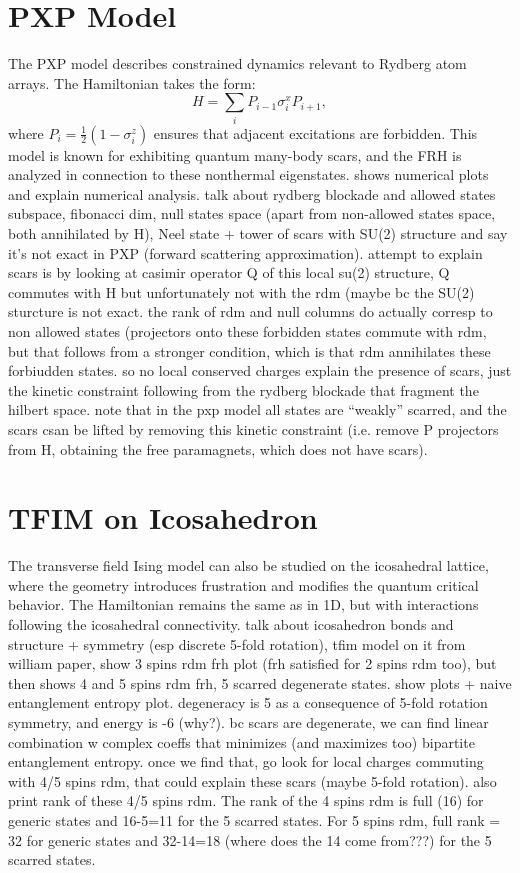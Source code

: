 \documentclass{article}
\begin{document}
\section{PXP Model}
The PXP model describes constrained dynamics relevant to Rydberg atom arrays. The Hamiltonian takes the form:
\begin{equation}
    H = \sum_i P_{i-1} \sigma^x_i P_{i+1},
\end{equation}
where $P_i = \frac{1}{2} (1 - \sigma^z_i)$ ensures that adjacent excitations are forbidden. This model is known for exhibiting quantum many-body scars, and the FRH is analyzed in connection to these nonthermal eigenstates. shows numerical plots and explain numerical analysis. talk about rydberg blockade and allowed states subspace, fibonacci dim, null states space (apart from non-allowed states space, both annihilated by H), Neel state + tower of scars with SU(2) structure and say it's not exact in PXP (forward scattering approximation). attempt to explain scars is by looking at casimir operator Q of this local su(2) structure, Q commutes with H but unfortunately not with the rdm (maybe bc the SU(2) sturcture is not exact. the rank of rdm and null columns do actually corresp to non allowed states (projectors onto these forbidden states commute with rdm, but that follows from a stronger condition, which is that rdm annihilates these forbiudden states. so no local conserved charges explain the presence of scars, just the kinetic constraint following from the rydberg blockade that fragment the hilbert space. note that in the pxp model all states are ``weakly'' scarred, and the scars csan be lifted by removing this kinetic constraint (i.e. remove P projectors from H, obtaining the free paramagnets, which does not have scars).

\section{TFIM on Icosahedron}
The transverse field Ising model can also be studied on the icosahedral lattice, where the geometry introduces frustration and modifies the quantum critical behavior. The Hamiltonian remains the same as in 1D, but with interactions following the icosahedral connectivity. talk about icosahedron bonds  and structure + symmetry (esp discrete 5-fold rotation), tfim model on it from william paper, show 3 spins rdm frh plot (frh satisfied for  2 spins rdm too), but then shows 4 and 5 spins rdm frh, 5 scarred degenerate states. show plots + naive entanglement entropy plot. degeneracy is 5 as a consequence of 5-fold rotation symmetry, and energy is -6 (why?). bc scars are  degenerate, we can find linear combination w complex coeffs that minimizes (and maximizes too) bipartite entanglement entropy. once we find that, go look for local charges commuting with 4/5 spins rdm, that could explain these scars (maybe 5-fold rotation). also print rank of these 4/5 spins rdm. The rank of the 4 spins rdm is full (16) for generic states and 16-5=11 for the 5 scarred states. For 5 spins rdm, full rank = 32 for generic states and 32-14=18 (where does the 14 come from???) for the 5 scarred states.
\end{document}
